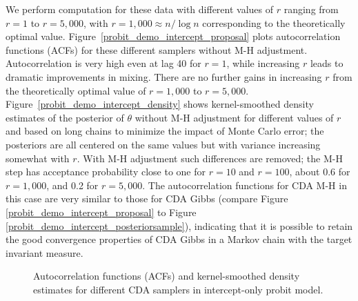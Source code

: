 \documentclass[11pt]{article}
\begin{document}
We perform computation for these data with different values of $r$ ranging from $r=1$ to $r=5,000$, with $r=1,000 \approx n/\log n$ corresponding to the theoretically optimal value.  Figure~\ref{probit_demo_intercept_proposal} plots autocorrelation functions (ACFs) for these different samplers without  M-H adjustment. Autocorrelation is very high even at lag 40 for $r=1$, while increasing $r$ leads to dramatic improvements in mixing. There are no further gains in increasing $r$ from the theoretically optimal value of $r=1,000$ to $r=5,000$. Figure~\ref{probit_demo_intercept_density} shows kernel-smoothed density estimates of the posterior of $\theta$ without M-H adjustment for different values of $r$ and based on long chains to minimize the impact of Monte Carlo error; the posteriors are all centered on the same values but with variance increasing somewhat with $r$.  With M-H adjustment such differences are removed; the M-H step has acceptance probability close to one for $r=10$ and $r=100$, about 0.6 for $r=1,000$, and 0.2 for $r=5,000$. The autocorrelation functions for CDA M-H in this case are very similar to those for CDA Gibbs (compare Figure \ref{probit_demo_intercept_proposal} to Figure \ref{probit_demo_intercept_posteriorsample}), indicating that it is possible to retain the good convergence properties of CDA Gibbs in a Markov chain with the target invariant measure.

\begin{figure}[H]
  {\caption{Autocorrelation functions (ACFs) and kernel-smoothed density estimates for different CDA samplers in intercept-only probit model.}}
  {%
    \quad
    \quad
  }
   \label{probit_demo_intercept}
\end{figure}
\end{document}
